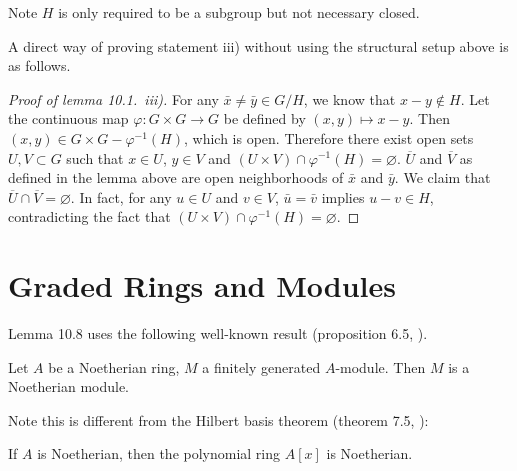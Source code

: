 \documentclass{note}
\begin{document}
\begin{remark*}
  Note $H$ is only required to be a subgroup but not necessary closed.
\end{remark*}

A direct way of proving statement iii) without using the structural setup above
is as follows.

\begin{proof}[Proof of lemma 10.1.~iii)] For any
  $\bar{x} \neq \bar{y} \in G/H$, we know that $x - y \notin H$. Let
  the continuous map $\varphi\colon G\times G \to G$ be defined by $(x,y) \mapsto
    x - y$. Then $(x,y) \in G\times G - \varphi^{-1}(H)$, which is open. Therefore
  there exist open sets $U,V \subset G$ such that $x\in U$, $y\in V$ and
  $(U\times V) \cap \varphi^{-1}(H) = \varnothing$. $\overline{U}$ and
  $\overline{V}$ as defined in the lemma above are open neighborhoods of
  $\bar{x}$ and $\bar{y}$. We claim that $\overline{U} \cap \overline{V} =
    \varnothing$. In fact, for any $u\in U$ and $v\in V$, $\bar{u} = \bar{v}$
  implies $u - v \in H$, contradicting the fact that $(U\times V) \cap
    \varphi^{-1}(H) = \varnothing$.
\end{proof}

\section*{Graded Rings and Modules}
Lemma 10.8 uses the following well-known result (proposition 6.5, ).
\begin{proposition*}
  Let $A$ be a Noetherian ring, $M$ a finitely generated $A$-module. Then $M$ is
  a Noetherian module.
\end{proposition*}
Note this is different from the Hilbert basis theorem (theorem 7.5, ):
\begin{theorem*}
  If $A$ is Noetherian, then the polynomial ring $A[x]$ is Noetherian.
\end{theorem*}
\end{document}
